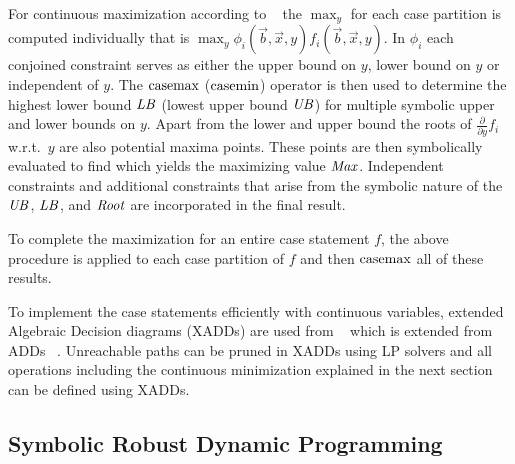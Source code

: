 For continuous maximization according to ~\cite{sdp_aaai} the $\max_y$ for each case partition
is computed individually that is $\max_y \phi_i(\vec{b},\vec{x},y) f_i(\vec{b},\vec{x},y)$.
In $\phi_i$ each conjoined constraint serves as either the upper bound on $y$, lower bound on $y$ or independent of $y$. The $\mathrm{casemax}$ ($\mathrm{casemin}$) operator is then used to determine the highest lower bound $\mathit{LB}$
(lowest upper bound $\mathit{UB}$) for multiple symbolic upper and lower bounds on $y$.
Apart from the lower and upper bound the roots of $\frac{\partial}{\partial y} f_i$ 
w.r.t.\ $y$  are also potential maxima points. These points are then symbolically evaluated to find which yields the
maximizing value $\mathit{Max}$.  Independent constraints and additional constraints that arise from the
symbolic nature of the $\mathit{UB}$, $\mathit{LB}$, and $\mathit{Root}$ are incorporated in the final result.

To complete the maximization for an entire case statement $f$, the
above procedure is applied to each case partition of $f$ and then $\mathrm{casemax}$ all
of these results.  

To implement the case statements efficiently with continuous variables, extended Algebraic Decision diagrams (XADDs) are used from ~\cite{sanner_uai11} which is extended from ADDs ~\cite{bahar93add}. Unreachable paths can be pruned in XADDs using LP solvers and all operations including the continuous minimization explained in the next section can be defined using XADDs. 


\subsection{Symbolic Robust Dynamic Programming}


